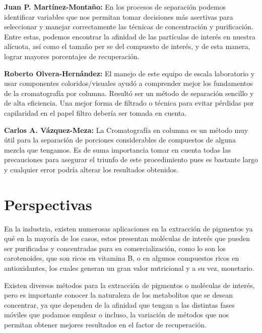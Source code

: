 \documentclass{ITESO-Project}
\begin{document}
{\color{darkgray}\bfseries Juan P. Martínez-Montaño:}\hspace{1em}
En los procesos de separación podemos identificar variables que nos permitan tomar decisiones más asertivas para seleccionar y manejar correctamente las técnicas de concentración y purificación. Entre estas, podemos encontrar la afinidad de las partículas de interés en nuestra alícuota, así como el tamaño per se del compuesto de interés, y de esta manera, lograr mayores porcentajes de recuperación. 

{\color{darkgray}\bfseries Roberto Olvera-Hernández:}\hspace{1em}
El manejo de este equipo de escala laboratorio y usar componentes coloridos/visuales ayudó a comprender mejor los fundamentos de la cromatografía por columna. Resultó ser un método de separación sencillo y de alta eficiencia. Una mejor forma de filtrado o técnica para evitar pérdidas por capilaridad en el papel filtro debería ser tomada en cuenta.

{\color{darkgray}\bfseries Carlos A. Vázquez-Meza:}\hspace{1em}
La Cromatografía en columna es un método muy útil para la separación de porciones considerables de compuestos de alguna mezcla que tengamos. Es de suma importancia tomar en cuenta todas las precauciones para asegurar el triunfo de este procedimiento pues es bastante largo y cualquier error podría alterar los resultados obtenidos.


\section{Perspectivas}\label{perspectivas}

En la industria, existen numerosas aplicaciones en la extracción de pigmentos ya qué en la mayoría de los casos, estos presentan moléculas de interés que pueden ser purificadas y concentradas para su comercialización, como lo son los carotenoides, que son ricos en vitamina B, o en algunos compuestos ricos en antioxidantes, los cuales generan un gran valor nutricional y a su vez, monetario.

Existen diversos métodos para la extracción de pigmentos o moléculas de interés, pero es importante conocer la naturaleza de los metabolitos que se desean concentrar, ya que dependen de la afinidad que tengan a las distintas fases móviles que podamos emplear o incluso, la variación de métodos que nos permitan obtener mejores resultados en el factor de recuperación.
\end{document}
